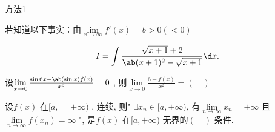 \begin{solution}
    [分析] 方法1

    若知道以下事实：由$ \lim\limits_{x \to \infty} f\prime(x) = b > 0 ( < 0 )  $ 
\end{solution}
\begin{question}
    \begin{equation*}
        I = \int \frac{ \sqrt{x + 1} + 2 }{\ab(x + 1)^2 - \sqrt{x + 1}} \d x.
    \end{equation*}
\end{question}
\begin{question}
    设$ \lim\limits_{x \to 0} \frac{ \sin 6x - \ab(\sin x) f(x) }{ x^3 } = 0 $ , 则$ \lim\limits_{x \to 0} \frac{6 - f(x)}{x^2} = (\quad) $ 
\end{question}
\begin{question}
    设$ f(x) $ 在$ [a, = +\infty) $ , 连续, 则" $ \exists x_n \in [a, +\infty) $, 有$ \lim\limits_{n \to \infty} x_n = +\infty $ 且$ \lim\limits_{n \to \infty} f(x_n) = \infty $ ", 是$ f(x) $ 在$ [a, +\infty) $ 无界的$ (\quad) $ 条件.
\end{question}